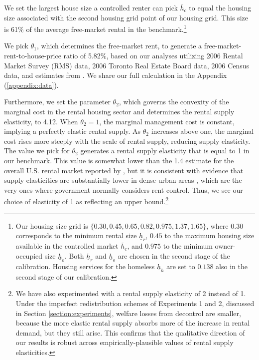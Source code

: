 \documentclass[parskip=full]{article}
\begin{document}
We set the largest house size a controlled renter can pick $\overline{h}_{c}$ to equal the housing size associated with the second housing grid point of our housing grid. This size is 61\% of the average free-market rental in the benchmark.\footnote{Our housing size grid is $\{0.30, 0.45, 0.65, 0.82, 0.975, 1.37, 1.65\}$, where $0.30$ corresponds to the minimum rental size $\underline{h}_{r}$, $0.45$ to the maximum housing size available in the controlled market $\overline{h}_{c}$, and $0.975$ to the minimum owner-occupied size $\underline{h}_{o}$. Both $\underline{h}_{r}$ and $\underline{h}_{o}$ are chosen in the second stage of the calibration. Housing services for the homeless $\underline{h}_{h}$ are set to $0.138$ also in the second stage of our calibration.} 

We pick $\theta_1$, which determines the free-market rent, to generate a free-market-rent-to-house-price ratio of 5.82\%, based on our analyses utilizing 2006 Rental Market Survey (RMS) data, 2006 Toronto Real Estate Board data, 2006 Census data, and estimates from \citet{zhang-gou}. We share our full calculation in the Appendix (\ref{appendix:data}).

Furthermore, we set the parameter $\theta_2$, which governs the convexity of the marginal cost in the rental housing sector and determines the rental supply elasticity, to 4.12. When $\theta_2=1$, the marginal management cost is constant, implying a perfectly elastic rental supply. As $\theta_2$ increases above one, the marginal cost rises more steeply with the scale of rental supply, reducing supply elasticity. The value we pick for $\theta_2$ generates a rental supply elasticity that is equal to 1 in our benchmark. This value is somewhat lower than the 1.4 estimate for the overall U.S. rental market reported by \citet{rs-2023}, but it is consistent with evidence that supply elasticities are substantially lower in dense urban areas \citep{cy-1994,susin-2002,fack-2006,sy-2020}, which are the very ones where government normally considers rent control. Thus, we see our choice of elasticity of 1 as reflecting an upper bound.\footnote{We have also experimented with a rental supply elasticity of 2 instead of 1. Under the imperfect redistribution schemes of Experiments 1 and 2, discussed in Section \ref{section:experiments}, welfare losses from decontrol are smaller, because the more elastic rental supply absorbs more of the increase in rental demand, but they still arise. This confirms that the qualitative direction of our results is robust across empirically-plausible values of rental supply elasticities.}
\end{document}
